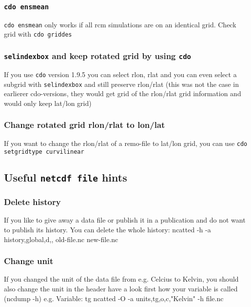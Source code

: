 \subsubsection{\texttt{cdo ensmean}}
\texttt{cdo ensmean} only works if all rcm simulations are on an identical grid.
Check grid with \texttt{cdo griddes}

\subsubsection{\texttt{selindexbox} and keep rotated grid by using \texttt{cdo}}
If you use \texttt{cdo} version 1.9.5 you can select rlon, rlat and you can even select a subgrid with \texttt{selindexbox} and still preserve rlon/rlat
(this was not the case in earlierer cdo-versions, they would get grid of the rlon/rlat grid information and would only keep lat/lon grid)

\subsubsection{Change rotated grid rlon/rlat to lon/lat}
If you want to change the rlon/rlat of a remo-file to lat/lon grid, you can use \texttt{cdo setgridtype curvilinear}

\subsection{Useful \texttt{netcdf file} hints}

\subsubsection{Delete history}
If you like to give away a data file or publish it in a publication and do not want to publish its history. 
You can delete the whole history:
ncatted -h -a history,global,d,, old-file.nc new-file.nc

\subsubsection{Change unit}
If you changed the unit of the data file from e.g. Celcius to Kelvin, you should also change the unit in the header
have a look first how your variable is called  (ncdump -h) 
e.g. Variable: tg
ncatted -O -a units,tg,o,c,"Kelvin" -h file.nc

